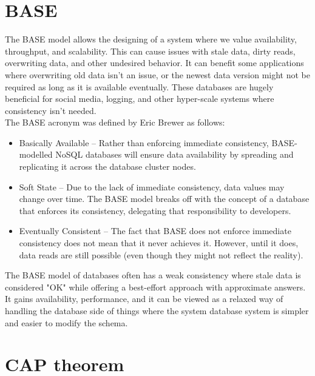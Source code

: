 \documentclass[a4paper,10pt,titlepage]{report}
\begin{document}
    \section{BASE}
    The BASE model allows the designing of a system where we value availability, throughput, and scalability. This can cause issues with stale data, dirty reads, overwriting data, and other undesired behavior. It can benefit some applications where overwriting old data isn't an issue, or the newest data version might not be required as long as it is available eventually. These databases are hugely beneficial for social media, logging, and other hyper-scale systems where consistency isn't needed.\\
    \vspace{5mm}
    The BASE acronym was defined by Eric Brewer\cite{brewer2000towards} as follows:

    \begin{itemize}
        \item Basically Available – Rather than enforcing immediate consistency, BASE-modelled NoSQL databases will ensure data availability by spreading and replicating it across the database cluster nodes.
        \item Soft State – Due to the lack of immediate consistency, data values may change over time. The BASE model breaks off with the concept of a database that enforces its consistency, delegating that responsibility to developers.
        \item Eventually Consistent – The fact that BASE does not enforce immediate consistency does not mean that it never achieves it. However, until it does, data reads are still possible (even though they might not reflect the reality).
    \end{itemize}

    The BASE model of databases often has a weak consistency where stale data is considered "OK" while offering a best-effort approach with approximate answers. It gains availability, performance, and it can be viewed as a relaxed way of handling the database side of things where the system database system is simpler and easier to modify the schema.


    \section{CAP theorem}
\end{document}
